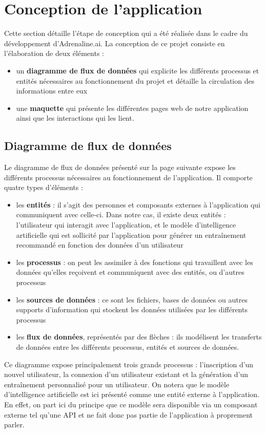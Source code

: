 \documentclass[french]{article}
\begin{document}
    \section{Conception de l'application}

    Cette section détaille l'étape de conception qui a été réalisée dans le cadre du développement d'Adrenaline.ai. La conception de ce projet consiste en l'élaboration de deux éléments :
    \begin{itemize}
        \item un \textbf{diagramme de flux de données} qui explicite les différents processus et entités nécessaires au fonctionnement du projet et détaille la circulation des informations entre eux
        \item une \textbf{maquette} qui présente les différentes pages web de notre application ainsi que les interactions qui les lient.
    \end{itemize}
    \subsection{Diagramme de flux de données}
    Le diagramme de flux de données présenté sur la page suivante expose les différents processus nécessaires au fonctionnement de l'application. Il comporte quatre types d'éléments :
    \begin{itemize}
        \item les \textbf{entités} : il s'agit des personnes et composants externes à l'application qui communiquent avec celle-ci. Dans notre cas, il existe deux entités : l'utilisateur qui interagit avec l'application, et le modèle d'intelligence artificielle qui est sollicité par l'application pour générer un entraînement recommandé en fonction des données d'un utilisateur
        \item les \textbf{processus} : on peut les assimiler à des fonctions qui travaillent avec les données qu'elles reçoivent et communiquent avec des entités, ou d'autres processus
        \item les \textbf{sources de données} : ce sont les fichiers, bases de données ou autres supports d'information qui stockent les données utilisées par les différents processus
        \item les \textbf{flux de données}, représentés par des flèches : ils modélisent les transferts de données entre les différents processus, entités et sources de données.
    \end{itemize}
    Ce diagramme expose principalement trois grands processus : l'inscription d'un nouvel utilisateur, la connexion d'un utilisateur existant et la génération d'un entraînement personnalisé pour un utilisateur. On notera que le modèle d'intelligence artificielle est ici présenté comme une entité externe à l'application. En effet, on part ici du principe que ce modèle sera disponible via un composant externe tel qu'une API et ne fait donc pas partie de l'application à proprement parler.
\end{document}
